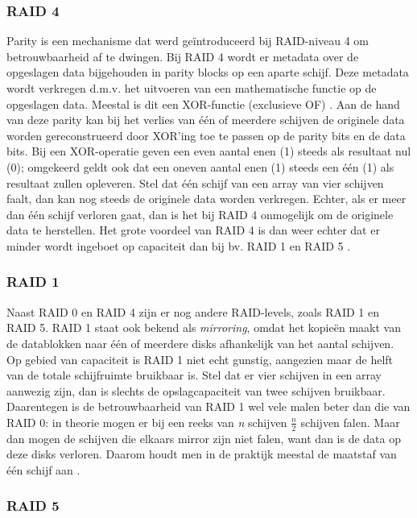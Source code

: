 \subsubsection{RAID 4}

Parity is een mechanisme dat werd geïntroduceerd bij RAID-niveau 4 om \gls{betrouwbaarheid} af te dwingen. Bij RAID 4 wordt er metadata over de opgeslagen data bijgehouden in \gls{parity} blocks op een aparte schijf. Deze metadata wordt verkregen d.m.v. het uitvoeren van een mathematische functie op de opgeslagen data. Meestal is dit een XOR-functie (exclusieve OF) \autocite{Chen1994}. Aan de hand van deze \gls{parity} kan bij het verlies van één of meerdere schijven de originele data worden gereconstrueerd door XOR'ing toe te passen op de \gls{parity} bits en de data bits. Bij een XOR-operatie geven een even aantal enen (1) steeds als resultaat nul (0); omgekeerd geldt ook dat een oneven aantal enen (1) steeds een één (1) als resultaat zullen opleveren. Stel dat één schijf van een array van vier schijven faalt, dan kan nog steeds de originele data worden verkregen. Echter, als er meer dan één schijf verloren gaat, dan is het bij RAID 4 onmogelijk om de originele data te herstellen. Het grote voordeel van RAID 4 is dan weer echter dat er minder wordt ingeboet op \gls{capaciteit}  dan bij bv. RAID 1 en RAID 5 \autocite{OSThreePiecesRemzi2015}. 

\subsubsection{RAID 1}

Naast RAID 0 en RAID 4 zijn er nog andere RAID-levels, zoals RAID 1 en RAID 5. RAID 1 staat ook bekend als \textit{mirroring}, omdat het kopieën maakt van de datablokken naar één of meerdere disks afhankelijk van het aantal schijven. Op gebied van \gls{capaciteit} is RAID 1 niet echt gunstig, aangezien maar de helft van de totale schijfruimte bruikbaar is. Stel dat er vier schijven in een array aanwezig zijn, dan is slechts de opslagcapaciteit van twee schijven bruikbaar. Daarentegen is de \gls{betrouwbaarheid} van RAID 1 wel vele malen beter dan die van RAID 0: in theorie mogen er bij een reeks van \textit{n} schijven $\frac{n}{2}$ schijven falen. Maar dan mogen de schijven die elkaars mirror zijn niet falen, want dan is de data op deze disks verloren.  Daarom houdt men in de praktijk meestal de maatstaf van één schijf aan \autocite{OSThreePiecesRemzi2015}.

\subsubsection{RAID 5}

